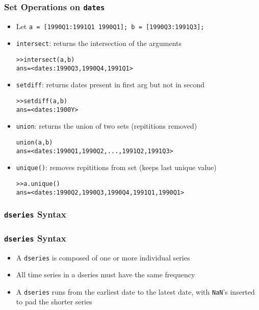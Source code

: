 \documentclass[10pt]{beamer}
\newcommand{\myitem}{\item[$\bullet$]}
\begin{document}
\begin{frame}[fragile,t]
  \frametitle{Set Operations on \texttt{dates}}
  \begin{itemize}
    \myitem Let \texttt{a = [1990Q1:1991Q1 1990Q1]; b = [1990Q3:1991Q3];}
    \myitem \texttt{intersect}: returns the intersection of the arguments
    \begin{alltt}
  >> intersect(a, b)
  ans = <dates: 1990Q3, 1990Q4, 1991Q1>
    \end{alltt}
    \myitem \texttt{setdiff}: returns dates present in first arg but not in second
    \begin{alltt}
  >> setdiff(a, b)
  ans = <dates: 1900Y>
    \end{alltt}
    \myitem \texttt{union}: returns the union of two sets (repititions removed)
    \begin{alltt}
  union(a, b)
  ans = <dates: 1990Q1, 1990Q2,  ..., 1991Q2, 1991Q3>
    \end{alltt}
    \myitem \texttt{unique()}: removes repititions from set (keeps last unique value)
    \begin{alltt}
  >> a.unique()
  ans = <dates: 1990Q2, 1990Q3, 1990Q4, 1991Q1, 1990Q1>
    \end{alltt}
  \end{itemize}
\end{frame}



%
%
\subsubsection{\texttt{dseries} Syntax}
\begin{frame}[fragile,t]
  \frametitle{\texttt{dseries} Syntax}
  \begin{itemize}
  \myitem A \texttt{dseries} is composed of one or more individual series
  \myitem All time series in a dseries must have the same frequency
  \myitem A \texttt{dseries} runs from the earliest date to the latest date, with \texttt{NaN}'s inserted to pad the shorter series
  \end{itemize}
\end{frame}
\end{document}
